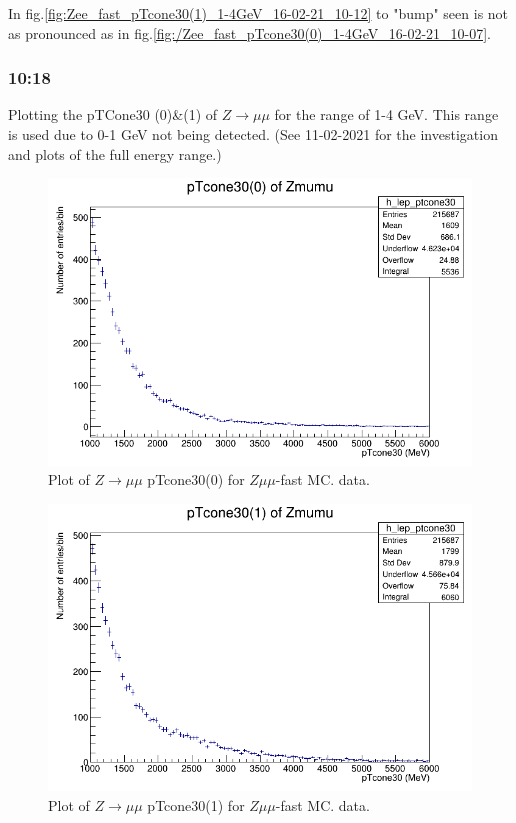 In fig.\ref{fig:Zee_fast_pTcone30(1)_1-4GeV_16-02-21_10-12} to "bump" seen is not as pronounced as in fig.\ref{fig:/Zee_fast_pTcone30(0)_1-4GeV_16-02-21_10-07}.


\subsubsection*{10:18}
Plotting the pTCone30 (0)\&(1) of $Z\rightarrow \mu\mu$ for the range of 1-4 GeV. This range is used due to 0-1 GeV not being detected. (See 11-02-2021 for the investigation and plots of the full energy range.)

\begin{figure}[h!]
    \centering
	\includegraphics[width=0.85\linewidth]{plots/16-02-2021/Zmumu_fast_pTcone30(0)_1-6GeV_16-02-21_10-18.png}
	\caption{Plot of  $Z \rightarrow \mu\mu$ pTcone30(0) for $Z\mu\mu$-fast MC.  data.}\label{fig:Zmumu_fast_pTcone30(0)_1-6GeV_16-02-21_10-18}
\end{figure}

\begin{figure}[h!]
    \centering
	\includegraphics[width=0.85\linewidth]{plots/16-02-2021/Zmumu_fast_pTcone30(1)_1-6GeV_16-02-21_10-21.png}
	\caption{Plot of  $Z \rightarrow \mu\mu$ pTcone30(1) for $Z\mu\mu$-fast MC.  data.}\label{fig:Zmumu_fast_pTcone30(1)_1-6GeV_16-02-21_10-21}
\end{figure}



